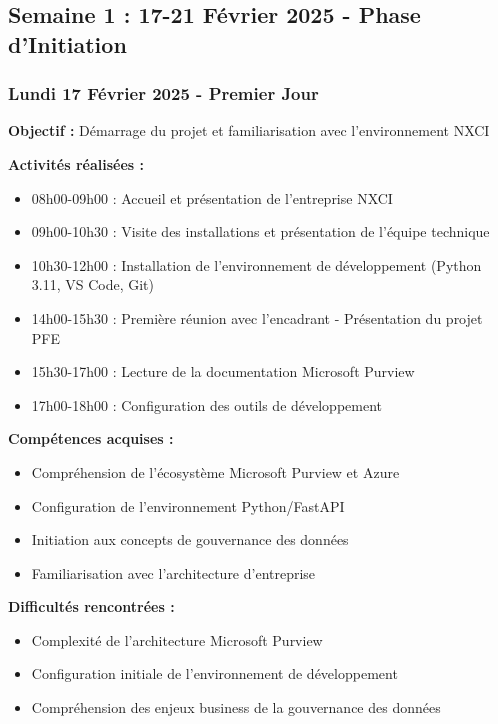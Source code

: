 
\subsection{Semaine 1 : 17-21 Février 2025 - Phase d'Initiation}

\subsubsection{Lundi 17 Février 2025 - Premier Jour}
\textbf{Objectif :} Démarrage du projet et familiarisation avec l'environnement NXCI

\textbf{Activités réalisées :}
\begin{itemize}
    \item 08h00-09h00 : Accueil et présentation de l'entreprise NXCI
    \item 09h00-10h30 : Visite des installations et présentation de l'équipe technique
    \item 10h30-12h00 : Installation de l'environnement de développement (Python 3.11, VS Code, Git)
    \item 14h00-15h30 : Première réunion avec l'encadrant - Présentation du projet PFE
    \item 15h30-17h00 : Lecture de la documentation Microsoft Purview
    \item 17h00-18h00 : Configuration des outils de développement
\end{itemize}

\textbf{Compétences acquises :}
\begin{itemize}
    \item Compréhension de l'écosystème Microsoft Purview et Azure
    \item Configuration de l'environnement Python/FastAPI
    \item Initiation aux concepts de gouvernance des données
    \item Familiarisation avec l'architecture d'entreprise
\end{itemize}

\textbf{Difficultés rencontrées :}
\begin{itemize}
    \item Complexité de l'architecture Microsoft Purview
    \item Configuration initiale de l'environnement de développement
    \item Compréhension des enjeux business de la gouvernance des données
\end{itemize}

